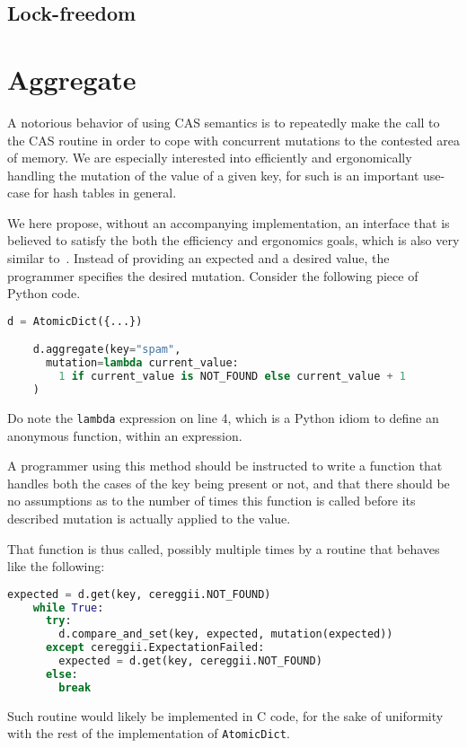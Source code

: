 \subsection{Lock-freedom}\label{subsec:batch-lookup-lock-freedom}


\section{Aggregate}\label{sec:aggregate}

A notorious behavior of using CAS semantics is to repeatedly make the call to the CAS routine in order to cope with concurrent mutations to the contested area of memory.
We are especially interested into efficiently and ergonomically handling the mutation of the value of a given key, for such is an important use-case for hash tables in general.

We here propose, without an accompanying implementation, an interface that is believed to satisfy the both the efficiency and ergonomics goals, which is also very similar to~\cite[Algorithm~1]{maier}.
Instead of providing an expected and a desired value, the programmer specifies the desired mutation.
Consider the following piece of Python code.
\begin{lstlisting}[label={lst:aggregate-usage}, language=Python]
	d = AtomicDict({...})

	d.aggregate(key="spam",
	  mutation=lambda current_value:
	    1 if current_value is NOT_FOUND else current_value + 1
	)
\end{lstlisting}
Do note the \texttt{lambda} expression on line 4, which is a Python idiom to define an anonymous function, within an expression.

A programmer using this method should be instructed to write a function that handles both the cases of the key being present or not, and that there should be no assumptions as to the number of times this function is called before its described mutation is actually applied to the value.

That function is thus called, possibly multiple times by a routine that behaves like the following:
\begin{lstlisting}[label={lst:aggregate}, language=Python]
	expected = d.get(key, cereggii.NOT_FOUND)
	while True:
	  try:
	    d.compare_and_set(key, expected, mutation(expected))
	  except cereggii.ExpectationFailed:
	    expected = d.get(key, cereggii.NOT_FOUND)
	  else:
	    break
\end{lstlisting}
Such routine would likely be implemented in C code, for the sake of uniformity with the rest of the implementation of \texttt{AtomicDict}.

